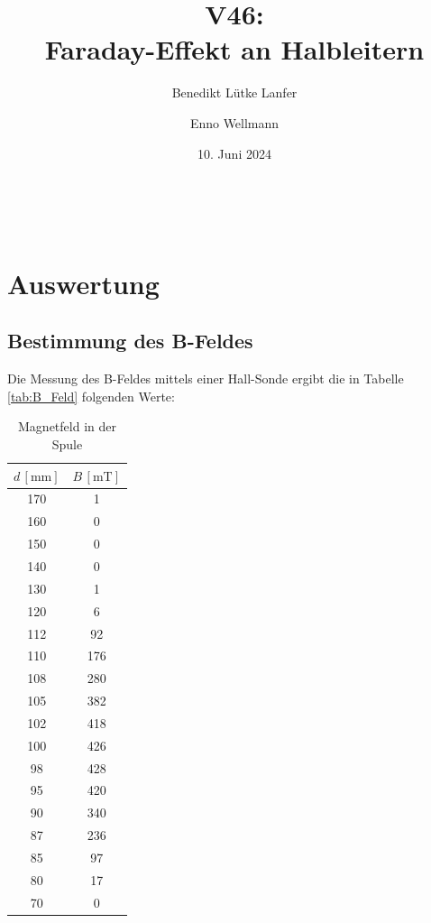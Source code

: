 

\title{V46:\\ Faraday-Effekt an Halbleitern}
\author{Benedikt Lütke Lanfer \and Enno Wellmann}
\date{10. Juni 2024}
\publishers{TU Dortmund – Fakultät Physik}


\let\t\text\


\tableofcontents
\newpage







\text{}
\newpage
\section{Auswertung}
\subsection{Bestimmung des B-Feldes}
Die Messung des B-Feldes mittels einer Hall-Sonde ergibt die in Tabelle \eqref{tab:B_Feld} folgenden Werte:

\begin{table}[H]
	\centering
    \label{tab:B_Feld}
	\begin{tabular}{c c}
		\toprule
		$d \, [\unit{\milli\meter}]$ & $B \, [\unit{\milli\tesla}] $  \\
		\midrule
        170 & 1 \\
        160 & 0 \\
        150 & 0 \\
        140 & 0 \\
        130 & 1 \\
        120 & 6 \\
        112 & 92 \\
        110 & 176 \\
        108 & 280 \\
        105 & 382 \\
        102 & 418 \\
        100 & 426 \\
        98  & 428 \\
        95  & 420 \\
        90  & 340 \\
        87  & 236 \\
        85  & 97 \\
        80  & 17 \\
        70  & 0  \\
		\bottomrule
	\end{tabular}
    \caption{Magnetfeld in der Spule}\label{tab:B_Feld}
\end{table}

